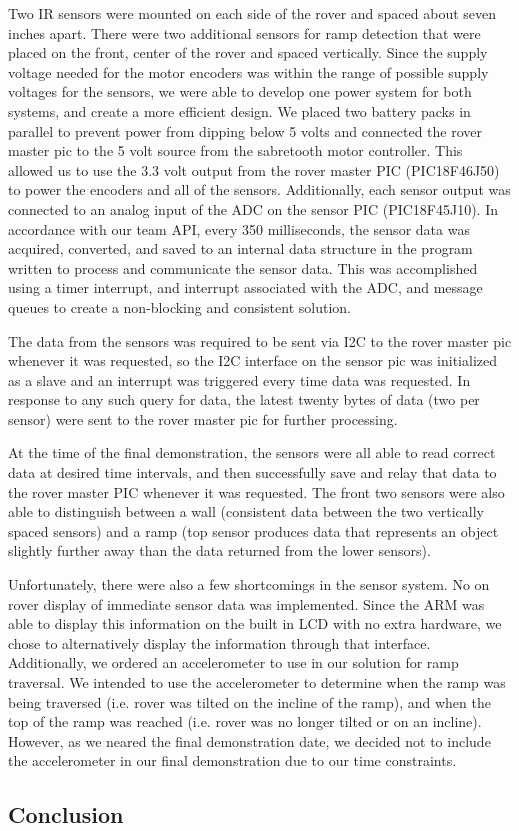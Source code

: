 Two IR sensors were mounted on each side of the rover and spaced about seven inches apart.  There were two additional sensors for ramp detection that were placed on the front, center of the rover and spaced vertically.  Since the supply voltage needed for the motor encoders was within the range of possible supply voltages for the sensors, we were able to develop one power system for both systems, and create a more efficient design.  We placed two battery packs in parallel to prevent power from dipping below 5 volts and connected the rover master pic to the 5 volt source from the sabretooth motor controller.  This allowed us to use the 3.3 volt output from the rover master PIC (PIC18F46J50) to power the encoders and all of the sensors.  Additionally, each sensor output was connected to an analog input of the ADC on the sensor PIC (PIC18F45J10).  In accordance with our team API, every 350 milliseconds, the sensor data was acquired, converted, and saved to an internal data structure in the program written to process and communicate the sensor data.  This was accomplished using a timer interrupt, and interrupt associated with the ADC, and message queues to create a non-blocking and consistent solution.  

The data from the sensors was required to be sent via I2C to the rover master pic whenever it was requested, so the I2C interface on the sensor pic was initialized as a slave and an interrupt was triggered every time data was requested.  In response to any such query for data, the latest twenty bytes of data (two per sensor) were sent to the rover master pic for further processing.  

At the time of the final demonstration, the sensors were all able to read correct data at desired time intervals, and then successfully save and relay that data to the rover master PIC whenever it was requested.  The front two sensors were also able to distinguish between a wall (consistent data between the two vertically spaced sensors) and a ramp (top sensor produces data that represents an object slightly further away than the data returned from the lower sensors).

Unfortunately, there were also a few shortcomings in the sensor system.  No on rover display of immediate sensor data was implemented.  Since the ARM was able to display this information on the built in LCD with no extra hardware, we chose to alternatively display the information through that interface.  Additionally, we ordered an accelerometer to use in our solution for ramp traversal.  We intended to use the accelerometer to determine when the ramp was being traversed (i.e. rover was tilted on the incline of the ramp), and when the top of the ramp was reached (i.e. rover was no longer tilted or on an incline).  However, as we neared the final demonstration date, we decided not to include the accelerometer in our final demonstration due to our time constraints.  


\subsection{Conclusion}


